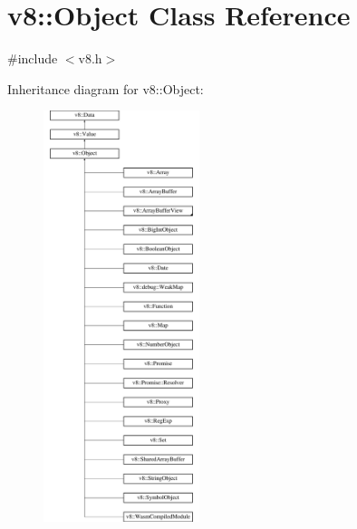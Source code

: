 \hypertarget{classv8_1_1Object}{\section{v8\-:\-:Object Class Reference}
\label{classv8_1_1Object}
}


{\ttfamily \#include $<$v8.\-h$>$}

Inheritance diagram for v8\-:\-:Object\-:\begin{figure}[H]
\begin{center}
\leavevmode
\includegraphics[height=12.000000cm]{classv8_1_1Object}
\end{center}
\end{figure}
